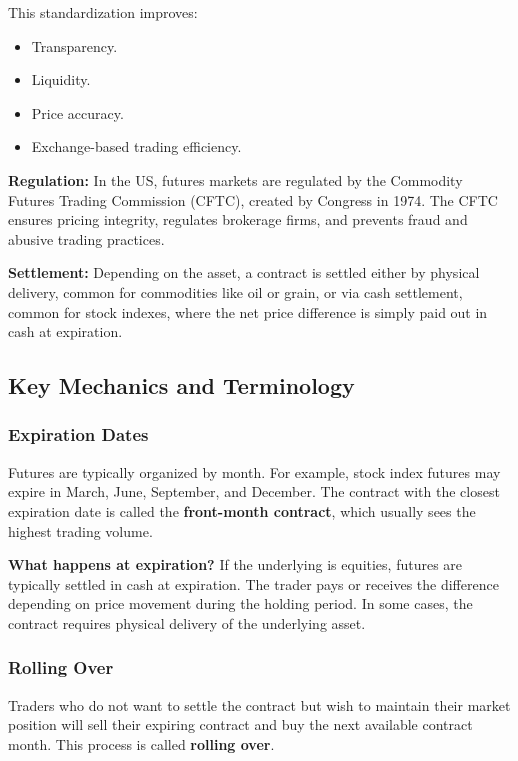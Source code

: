 \documentclass[12pt,openany]{book}
\begin{document}
This standardization improves:

\begin{itemize}[leftmargin=*]
    \item Transparency.
    \item Liquidity.
    \item Price accuracy.
    \item Exchange-based trading efficiency.
\end{itemize}

\textbf{Regulation:} In the US, futures markets are regulated by the Commodity Futures Trading Commission (CFTC), created by Congress in 1974. The CFTC ensures pricing integrity, regulates brokerage firms, and prevents fraud and abusive trading practices.

\textbf{Settlement:} Depending on the asset, a contract is settled either by physical delivery, common for commodities like oil or grain, or via cash settlement, common for stock indexes, where the net price difference is simply paid out in cash at expiration.

\subsection{Key Mechanics and Terminology}

\subsubsection{Expiration Dates}

Futures are typically organized by month. For example, stock index futures may expire in March, June, September, and December. The contract with the closest expiration date is called the \textbf{front-month contract}, which usually sees the highest trading volume.

\textbf{What happens at expiration?} If the underlying is equities, futures are typically settled in cash at expiration. The trader pays or receives the difference depending on price movement during the holding period. In some cases, the contract requires physical delivery of the underlying asset.

\subsubsection{Rolling Over}

Traders who do not want to settle the contract but wish to maintain their market position will sell their expiring contract and buy the next available contract month. This process is called \textbf{rolling over}.
\end{document}
